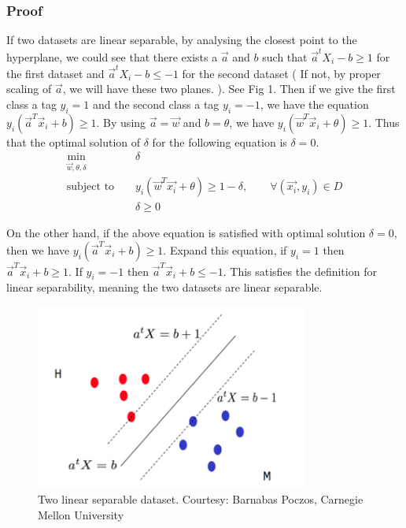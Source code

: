 \subsubsection{Proof}
\noindent If two datasets are linear separable, by analysing the closest point to the hyperplane, we could see that there exists a $\vec{a}$ and $b$ such that $\vec{a}^tX_i-b\geq1$ for the first dataset and $\vec{a}^tX_i-b\leq-1$ for the second dataset ( If not, by proper scaling of $\vec{a}$, we will have these two planes. ). See Fig 1. Then if we give the first class a tag $y_i=1$ and the second class a tag $y_i=-1$, we have the equation $y_i(\vec{a}^T\vec{x}_i+b)\geq 1$. By using $\vec{a}=\vec{w}$ and $b=\theta$, we have $y_i(\vec{w}^T\vec{x}_i+\theta)\geq 1$. Thus that the optimal solution of $\delta$ for the following equation is $\delta=0$.
\begin{eqnarray*}
	\min_{\vec{w}, \theta, \delta} & & \delta  \label{eq:lin_prog_discriminant_obj}\\
	\textrm{subject to } & & y_i(\vec{w}^T \vec{x_i} + \theta) \geq 1 - \delta, \qquad \forall (\vec{x_i},y_i) \in D  \label{eq:lin_prog_discriminant_constraint}\\
	& & \delta \geq 0  \label{eq:lin_prog_discriminant_bound}
\end{eqnarray*}

\noindent On the other hand, if the above equation is satisfied with optimal solution $\delta=0$, then we have $y_i(\vec{a}^T\vec{x}_i+b)\geq 1$. Expand this equation, if $y_i=1$ then $\vec{a}^T\vec{x}_i+b\geq 1$. If $y_i=-1$ then $\vec{a}^T\vec{x}_i+b\leq -1$. This satisfies the definition for linear separability, meaning the two datasets are linear separable.
\begin{figure}[h!]
	\centering
	\includegraphics[width=0.8\textwidth]{LinearSeparable}
	\caption{Two linear separable dataset. Courtesy: Barnabas Poczos, Carnegie Mellon University}
\end{figure}

